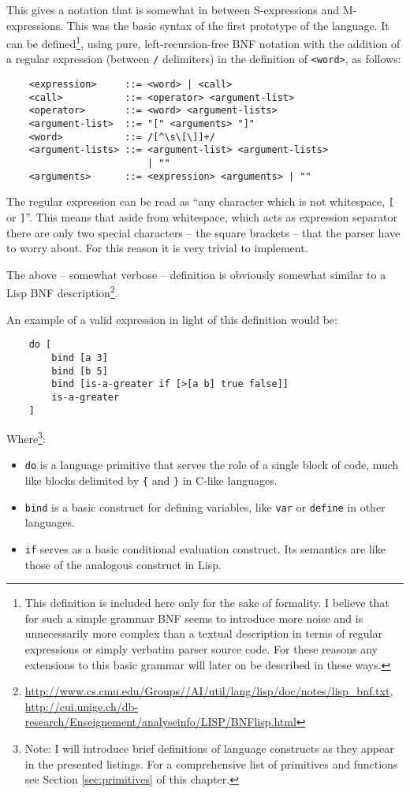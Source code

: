 This gives a notation that is somewhat in between S-expressions and M-expressions. This was the basic syntax of the first prototype of the language. It can be defined\footnote{This definition is included here only for the sake of formality. I believe that for such a simple grammar BNF seems to introduce more noise and is unnecessarily more complex than a textual description in terms of regular expressions or simply verbatim parser source code. For these reasons any extensions to this basic grammar will later on be described in these ways.}, using pure, left-recursion-free BNF notation with the addition of a regular expression (between \texttt{/} delimiters) in the definition of \texttt{<word>}, as follows:
\begin{lstlisting}
    <expression>     ::= <word> | <call>
    <call>           ::= <operator> <argument-list>
    <operator>       ::= <word> <argument-lists>
    <argument-list>  ::= "[" <arguments> "]"
    <word>           ::= /[^\s\[\]]+/
    <argument-lists> ::= <argument-list> <argument-lists>
                         | ""
    <arguments>      ::= <expression> <arguments> | ""
\end{lstlisting}

The regular expression can be read as ``any character which is not whitespace, \texttt{[} or \texttt{]}''. This means that aside from whitespace, which acts as expression separator there are only two special characters -- the square brackets -- that the parser have to worry about. For this reason it is very trivial to implement.

The above -- somewhat verbose -- definition is obviously somewhat similar to a Lisp BNF description\footnote{\url{http://www.cs.cmu.edu/Groups//AI/util/lang/lisp/doc/notes/lisp_bnf.txt}, \url{http://cui.unige.ch/db-research/Enseignement/analyseinfo/LISP/BNFlisp.html}}.

An example of a valid expression in light of this definition would be:
\begin{lstlisting}
    do [
        bind [a 3]
        bind [b 5]
        bind [is-a-greater if [>[a b] true false]]
        is-a-greater
    ]
\end{lstlisting}

Where\footnote{Note: I will introduce brief definitions of language constructs as they appear in the presented listings. For a comprehensive list of primitives and functions see Section \ref{sec:primitives} of this chapter.}:

\begin{itemize}
    \item \texttt{do} is a language primitive that serves the role of a single block of code, much like blocks delimited by \texttt{\{} and \texttt{\}} in C-like languages.
    \item \texttt{bind} is a basic construct for defining variables, like \texttt{var} or \texttt{define} in other languages.
    \item \texttt{if} serves as a basic conditional evaluation construct. Its semantics are like those of the analogous construct in Lisp.
\end{itemize}

